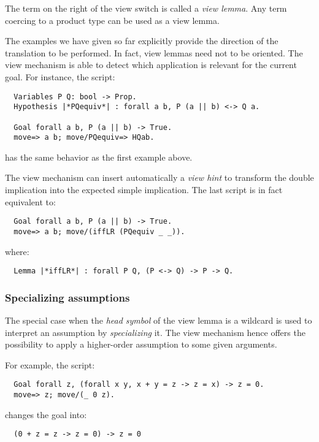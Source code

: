 The term on the right of the \ssrC{/} view switch is called a \emph{view
  lemma}. Any \ssr{} term coercing to a product type can be used as a
view lemma.


The examples we have given so far explicitly provide the direction of the
translation to be performed. In fact, view lemmas need not to be
oriented. The view mechanism is able to detect which
application is relevant for the current goal. For instance, the
script:
\begin{lstlisting}
  Variables P Q: bool -> Prop.
  Hypothesis |*PQequiv*| : forall a b, P (a || b) <-> Q a.

  Goal forall a b, P (a || b) -> True.
  move=> a b; move/PQequiv=> HQab.
\end{lstlisting}
has the same behavior as the first example above.

The view mechanism can insert automatically a \emph{view hint} to
transform the double implication into the expected simple implication.
The last script is in fact equivalent to:
\begin{lstlisting}
  Goal forall a b, P (a || b) -> True.
  move=> a b; move/(iffLR (PQequiv _ _)).
\end{lstlisting}
where:
\begin{lstlisting}
  Lemma |*iffLR*| : forall P Q, (P <-> Q) -> P -> Q.
\end{lstlisting}


\subsubsection*{Specializing assumptions}

The special case when the \emph{head symbol} of the view lemma is a
wildcard is used to interpret an assumption by \emph{specializing}
it. The view mechanism hence offers the possibility to
apply a higher-order assumption to some given arguments.

For example, the script:
\begin{lstlisting}
  Goal forall z, (forall x y, x + y = z -> z = x) -> z = 0.
  move=> z; move/(_ 0 z).
\end{lstlisting}
changes the goal into:
\begin{lstlisting}
  (0 + z = z -> z = 0) -> z = 0
\end{lstlisting}




